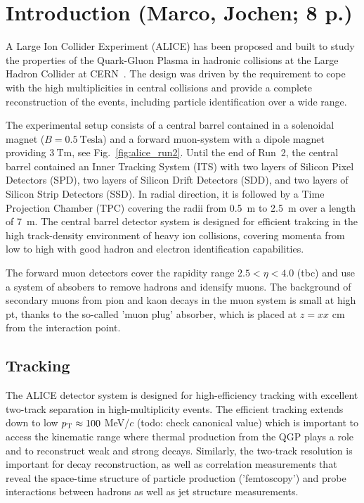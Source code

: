 \section{Introduction (Marco, Jochen; 8 p.)}

A Large Ion Collider Experiment (ALICE) has been proposed and built to study
the properties of the Quark-Gluon Plasma in hadronic collisions at the Large
Hadron Collider at CERN~\cite{Aamodt:2008zz}. The design was driven by the
requirement to cope with the high multiplicities in central \PbPb collisions
and provide a complete reconstruction of the events, including particle
identification over a wide \pt range.

The experimental setup consists of a central barrel contained in a solenoidal
magnet ($B = 0.5~\mathrm{Tesla}$) and a forward muon-system with a dipole magnet
providing $3~\mathrm{Tm}$, see Fig.~\ref{fig:alice_run2}. Until the end of Run~2,
the central barrel contained an Inner Tracking System (ITS) with two layers of
Silicon Pixel Detectors (SPD), two layers of Silicon Drift Detectors (SDD), and
two layers of Silicon Strip Detectors (SSD). In radial direction, it is followed
by a Time Projection Chamber (TPC) covering the radii from 0.5~m to 2.5~m over a
length of 7~m.
The central barrel detector system is designed for efficient trakcing in the high track-density environment of heavy ion collisions, covering momenta from low to high \pt{} with good hadron and electron identification capabilities.

The forward muon detectors cover the rapidity range $2.5 < \eta < 4.0$ (tbc) and use a system of absobers to remove hadrons and idensify muons.
The background of secondary muons from pion and kaon decays in the muon system is small at high pt, thanks to the so-called 'muon plug' absorber, which is placed at $z = xx$ cm from the interaction point.

\subsection{Tracking}

The ALICE detector system is designed for high-efficiency tracking with excellent two-track separation in high-multiplicity events. The efficient tracking extends down to low $p_{\rm T} \approx 100$ MeV/$c$ (todo: check canonical value) which is important to access the kinematic range where thermal production from the QGP plays a role and to reconstruct weak and strong decays.
Similarly, the two-track resolution is important for decay reconstruction, as well as correlation measurements that reveal the space-time structure of particle production ('femtoscopy') and probe interactions between hadrons as well as jet structure measurements.

